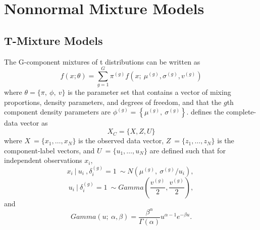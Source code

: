 \section{Nonnormal Mixture Models}
\label{sec:nonnormalMixModels}

\subsection{T-Mixture Models}
\label{sec:tmix_ch3}
The G-component mixtures of t distributions can be written as
\begin{equation*}
f( x;\theta ) =\sum ^{G}_{g=1} \pi ^{( g)} f\left( x;\ \mu ^{( g)} ,\sigma ^{( g)} ,v^{( g)}\right)
\end{equation*}
where $\displaystyle \theta =\{\pi ,\ \phi ,\ v\}$ is the parameter set that contains a vector of mixing proportions, density parameters, and degrees of freedom, and that the $\displaystyle g$th component density parameters are $\displaystyle \phi ^{( g)} =\left\{\mu ^{( g)} ,\ \sigma ^{( g)}\right\}$.  defines the complete-data vector as 
\begin{equation*}
X_{C} =\{X,Z,U\}
\end{equation*}
	where $\displaystyle X\ =\{x_{1} ,\dotsc ,x_{N}\}$ is the observed data vector,
	$\displaystyle Z\ =\{z_{1} ,\dotsc ,z_{N}\}$ is the component-label vectors, and 
	$\displaystyle U\ =\{u_{1} ,\dotsc ,u_{N}\}$ are defined such that for independent observations $\displaystyle x_{i}$,
\begin{equation*}
x_{i} \ |\ u_{i} \ ,\delta ^{( g)}_{i} =1\ \sim N\left( \mu ^{( g)} ,\ \sigma ^{( g)} /u_{i}\right) ,\ 
\end{equation*}
\begin{equation*}
u_{i} \ |\ \delta ^{( g)}_{i} =1\ \sim Gamma\left(\frac{v^{( g)}}{2} ,\frac{v^{( g)}}{2}\right) ,
\end{equation*}
	and
\begin{equation*}
Gamma( u;\ \alpha ,\beta ) =\frac{\beta ^{\alpha }}{\Gamma ( \alpha )} u^{\alpha -1} e^{-\beta u} .
\end{equation*}
